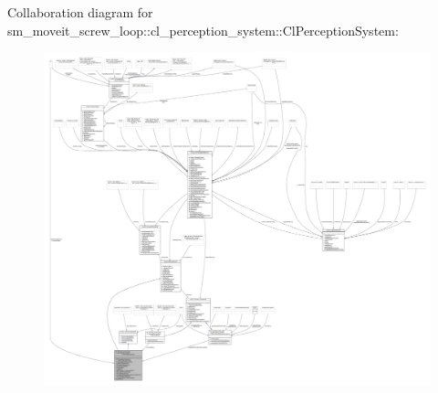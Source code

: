 Collaboration diagram for sm\+\_\+moveit\+\_\+screw\+\_\+loop\+:\+:cl\+\_\+perception\+\_\+system\+:\+:Cl\+Perception\+System\+:
\nopagebreak
\begin{figure}[H]
\begin{center}
\leavevmode
\includegraphics[width=350pt]{classsm__moveit__screw__loop_1_1cl__perception__system_1_1ClPerceptionSystem__coll__graph}
\end{center}
\end{figure}
